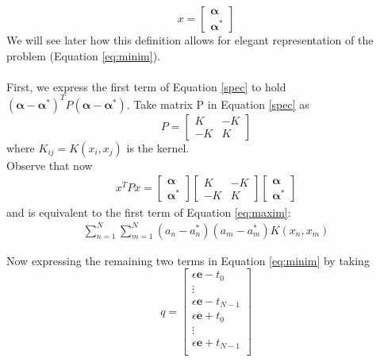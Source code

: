 \documentclass[12pt,notitlepage,twoside]{scrreprt}
\begin{document}
\[x =
  \begin{bmatrix}
    \bm{ \alpha} \\
    \bm{ \alpha^*}
  \end{bmatrix}
\]
We will see later how this definition allows for elegant representation of
the problem (Equation \ref{eq:minim}).
\paragraph*{}
First, we express the first term of Equation \ref{spec} to hold \((\bm{\alpha-\alpha^*})^T
P (\bm{\alpha - \alpha^*})\).
Take matrix P in Equation \ref{spec} as 
\[P =
\begin{bmatrix}
       K & -K           \\
       -K & K            
     \end{bmatrix}
\]
where \(K_{ij} = K(x_i,x_j)\) is the kernel.
\\
Observe that now
\begin{gather*}
x^T P x =
  \begin{bmatrix}
    \bm{ \alpha} \\
    \bm{ \alpha^*}
  \end{bmatrix}
\begin{bmatrix}
       K & -K           \\
       -K & K            
     \end{bmatrix}
  \begin{bmatrix}
    \bm{ \alpha} \\
    \bm{ \alpha^*}
  \end{bmatrix}
\end{gather*}
and is equivalent to the first term of Equation \ref{eq:maxim}:
\begin{gather*}
\sum_{n=1}^{N}\sum_{m=1}^{N}(a_n-a_n^*)(a_m-a_m^*)K(x_n,x_m)
\end{gather*}

Now expressing the remaining two terms in Equation \ref{eq:minim} by taking 
\[q =
\begin{bmatrix}
  \epsilon\mathbf{e}-t_0           \\
  \vdots                                     \\
  \epsilon\mathbf{e}-t_{N-1}           \\
   \epsilon\mathbf{e}+t_0           \\
   \vdots                           \\
  \epsilon\mathbf{e}+t_{N-1}           \\
     \end{bmatrix}
\]
\end{document}
